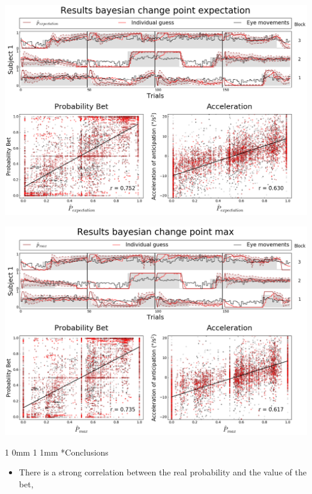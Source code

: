 \documentclass[profile,final,english, draft]{article}%
\makeatletter
\renewcommand{\section}{\@startsection
        {section}%
        {1}%
        {0mm}%
        {1\baselineskip}%
        {1mm}%
        {\large\color{red}\bfseries}}%
\makeatother
\begin{document}
\begin{multicols}{3}
\begin{center} 
    \includegraphics[width=1\columnwidth]{results_bayesianchangepoint_e}
\end{center}

\begin{center} 
    \includegraphics[width=1\columnwidth]{results_bayesianchangepoint_m}
\end{center}



\section*{Conclusions}


\begin{itemize}\setlength{\itemsep}{0ex}
\item There is a strong correlation between the real probability and the value of the bet,


\end{itemize}
\end{multicols}
\end{document}
